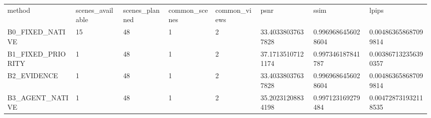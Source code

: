 \begin{tabular}{llllllll}
method & scenes\_available & scenes\_planned & common\_scenes & common\_views & psnr & ssim & lpips \\
B0\_FIXED\_NATIVE & 15 & 48 & 1 & 2 & 33.40338037637828 & 0.9969686456028604 & 0.004863658687099814 \\
B1\_FIXED\_PRIORITY & 1 & 48 & 1 & 2 & 37.17135107121174 & 0.997346187841787 & 0.003867132356390357 \\
B2\_EVIDENCE & 1 & 48 & 1 & 2 & 33.40338037637828 & 0.9969686456028604 & 0.004863658687099814 \\
B3\_AGENT\_NATIVE & 1 & 48 & 1 & 2 & 35.20231208834198 & 0.997123169279484 & 0.004728731932118535 \\
\end{tabular}
